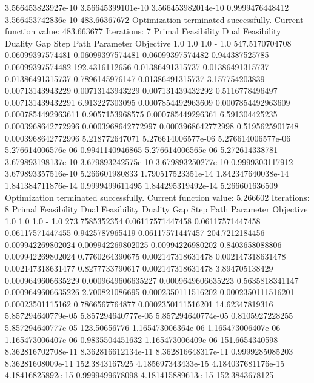 \documentclass[letterpaper,10pt,english]{sphinxmanual}
\begin{document}
{\begin{sphinxVerbatim}[commandchars=\\\{\}]
3.566453823927e-10  3.56645399101e-10   3.566453982014e-10  0.9999476448412  3.566453742836e-10  483.66367672
Optimization terminated successfully.
         Current function value: 483.663677
         Iterations: 7
Primal Feasibility  Dual Feasibility    Duality Gap         Step             Path Parameter      Objective
1.0                 1.0                 1.0                 -                1.0                 547.5170704708
0.06099397574481    0.06099397574481    0.06099397574482    0.944387525785   0.06099397574482    192.4316112656
0.01386491315737    0.01386491315737    0.01386491315737    0.7896145976147  0.01386491315737    3.157754203839
0.00713143943229    0.00713143943229    0.007131439432292   0.5116778496497  0.007131439432291   6.913227303095
0.0007854492963609  0.0007854492963609  0.0007854492963611  0.9057153968575  0.000785449296361   6.591304425235
0.0003968642772996  0.0003968642772997  0.0003968642772998  0.5195625901748  0.0003968642772996  5.218772647071
5.276614006577e-06  5.276614006577e-06  5.276614006576e-06  0.9941140946865  5.276614006565e-06  5.272614338781
3.679893198137e-10  3.679893242575e-10  3.679893250277e-10  0.9999303117912  3.679893357516e-10  5.266601980833
1.790517523351e-14  1.842347640038e-14  1.841384711876e-14  0.9999499611495  1.844295319492e-14  5.266601636509
Optimization terminated successfully.
         Current function value: 5.266602
         Iterations: 8
Primal Feasibility  Dual Feasibility    Duality Gap         Step             Path Parameter      Objective
1.0                 1.0                 1.0                 -                1.0                 273.7585352354
0.06117571447458    0.06117571447458    0.06117571447455    0.9425787965419  0.06117571447457    204.7212184456
0.009942269802024   0.009942269802025   0.00994226980202    0.8403658088806  0.009942269802024   0.7760264390675
0.002147318631478   0.002147318631478   0.002147318631477   0.8277733790617  0.002147318631478   3.894705138429
0.0009649606635229  0.0009649606635227  0.0009649606635223  0.5635818341147  0.0009649606635226  2.700821086695
0.0002350111516202  0.0002350111516201  0.00023501115162    0.7866567764877  0.0002350111516201  14.62347819316
5.857294640779e-05  5.857294640777e-05  5.857294640774e-05  0.8105927228255  5.857294640777e-05  123.50656776
1.165473006364e-06  1.165473006407e-06  1.165473006407e-06  0.9835504451632  1.165473006409e-06  151.6654340598
8.362816702708e-11  8.362816612134e-11  8.362816648317e-11  0.9999285085203  8.36281608009e-11   152.3843167925
4.185697343433e-15  4.184037681176e-15  4.18416825892e-15   0.9999499678098  4.181415889613e-15  152.3843678125

\end{sphinxVerbatim}}
\end{document}
